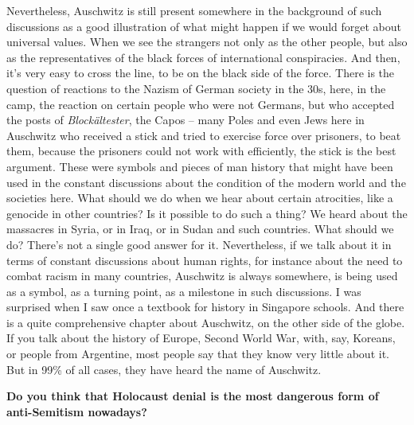Nevertheless, Auschwitz is still present somewhere in the background of such discussions as a good illustration of what might happen if we would forget about universal values. When we see the strangers not only as the other people, but also as the representatives of the black forces of international conspiracies. And then, it’s very easy to cross the line, to be on the black side of the force. There is the question of reactions to the Nazism of German society in the 30s, here, in the camp, the reaction on certain people who were not Germans, but who accepted the posts of \textit{Blockältester}, the Capos – many Poles and even Jews here in Auschwitz who received a stick and tried to exercise force over prisoners, to beat them, because the prisoners could not work with efficiently, the stick is the best argument. These were symbols and pieces of man history that might have been used in the constant discussions about the condition of the modern world and the societies here. What should we do when we hear about certain atrocities, like a genocide in other countries? Is it possible to do such a thing? We heard about the massacres in Syria, or in Iraq, or in Sudan and such countries. What should we do? There’s not a single good answer for it. Nevertheless, if we talk about it in terms of constant discussions about human rights, for instance about the need to combat racism in many countries, Auschwitz is always somewhere, is being used as a symbol, as a turning point, as a milestone in such discussions. I was surprised when I saw once a textbook for history in Singapore schools. And there is a quite comprehensive chapter about Auschwitz, on the other side of the globe. If you talk about the history of Europe, Second World War, with, say, Koreans, or people from Argentine, most people say that they know very little about it. But in 99\% of all cases, they have heard the name of Auschwitz.
 
\textbf{Do you think that Holocaust denial is the most dangerous form of anti-Semitism nowadays?}

